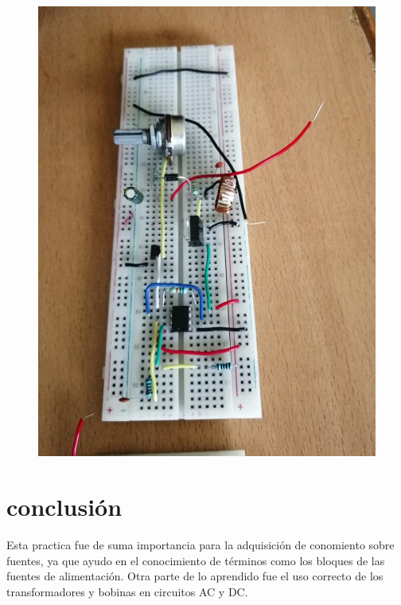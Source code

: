 \documentclass[11pt,a4paper]{article}
\begin{document}
\begin{figure}
\begin{center}
\includegraphics[scale=0.5]{6.jpeg}
\end{center}
\end{figure}



\section{conclusión}

Esta practica fue de suma importancia para la adquisición de conomiento sobre fuentes, ya que ayudo en el conocimiento de términos como los bloques de las fuentes de alimentación. Otra parte de lo aprendido fue el uso correcto de los transformadores y bobinas en circuitos AC y DC.
\end{document}
